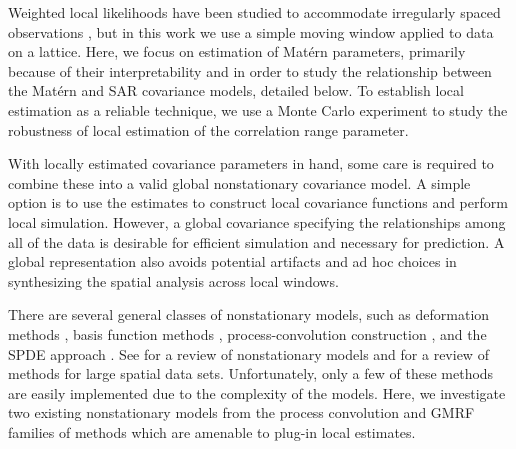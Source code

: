 \documentclass[review]{elsarticle}
\begin{document}
Weighted local likelihoods have been studied to accommodate irregularly spaced observations \cite{anderes2011local}, but in this work we use a simple moving window applied to data on a lattice. Here, we focus on estimation of Mat\'ern parameters, primarily because of their interpretability and in order to study the relationship between the Mat\'ern and SAR covariance models, detailed below. To establish local estimation as a reliable technique, we use a Monte Carlo experiment to study the robustness of local estimation of the correlation range parameter. 


With locally estimated covariance parameters in hand, some care is required to combine these into a valid global nonstationary covariance model. A simple option is to use the estimates to construct local covariance functions and perform local simulation. However, a global covariance specifying the relationships among all of the data is desirable for efficient simulation and necessary for prediction. A global representation also avoids potential artifacts and ad hoc choices in synthesizing the spatial analysis across local windows.



There are several general classes of nonstationary models, such as deformation methods \cite{sampsonguttorp, anderes2008estimating}, basis function methods \cite{cressie2008fixed, katzfuss2011spatio, nychka2015multiresolution, nychka2002multiresolution}, process-convolution construction \cite{higdon1998process, higdon1999non, higdon2002space, paciorek2004nonstationary, fuentes2001new, fuentes2002spectral, zhu2010estimation}, and the SPDE approach \cite{lindgren2011explicit, lindgren2007explicit, simpson2012think, rue2005gaussian}. See \cite{risser2016nonstationary} for a review of nonstationary models and \cite{heaton2017methods} for a review of methods for large spatial data sets. Unfortunately, only a few of these methods are easily implemented due to the complexity of the models. Here, we investigate two existing nonstationary models from the process convolution and GMRF families of methods which are amenable to plug-in local estimates.


\end{document}
